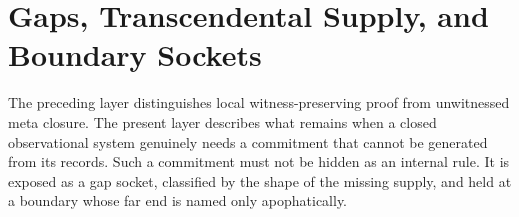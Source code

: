 \section{Gaps, Transcendental Supply, and Boundary Sockets}
\label{sec:visions-philosophy-gap-t-boundary}

The preceding layer distinguishes local witness-preserving proof from
unwitnessed meta closure. The present layer describes what remains when
a closed observational system genuinely needs a commitment that cannot
be generated from its records. Such a commitment must not be hidden as
an internal rule. It is exposed as a gap socket, classified by the
shape of the missing supply, and held at a boundary whose far end is
named only apophatically.





